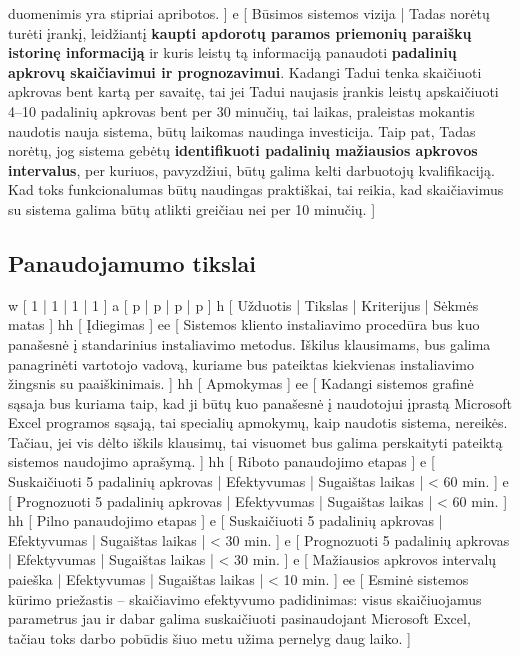 {    duomenimis yra stipriai apribotos.
  ]
  e [ Būsimos sistemos vizija
  | 
    Tadas norėtų turėti įrankį, leidžiantį \textbf{kaupti apdorotų paramos priemonių paraiškų
    istorinę informaciją} ir kuris leistų tą informaciją panaudoti \textbf{padalinių apkrovų 
    skaičiavimui ir prognozavimui}.
    Kadangi Tadui tenka skaičiuoti apkrovas bent kartą per savaitę, tai jei Tadui naujasis 
    įrankis leistų apskaičiuoti 4–10 padalinių apkrovas bent per 30 minučių, 
    tai laikas, praleistas mokantis naudotis nauja sistema, būtų laikomas naudinga investicija.
    Taip pat, Tadas norėtų, jog sistema gebėtų \textbf{identifikuoti padalinių
    mažiausios apkrovos intervalus}, per kuriuos, pavyzdžiui, būtų galima kelti darbuotojų
    kvalifikaciją. Kad toks funkcionalumas būtų naudingas praktiškai, tai 
    reikia, kad skaičiavimus su sistema galima būtų atlikti greičiau
    nei per 10 minučių.
  ]
}

\subsection{Panaudojamumo tikslai}
\xtable
{
  w [ 1 | 1 | 1 | 1 ]
  a [ p | p | p | p ]
  h [ Užduotis | Tikslas | Kriterijus | Sėkmės matas ]
  hh [ Įdiegimas ]
  ee 
  [ 
    Sistemos kliento instaliavimo procedūra bus kuo panašesnė į standarinius instaliavimo 
    metodus. Iškilus klausimams, bus galima panagrinėti vartotojo vadovą, kuriame bus pateiktas
    kiekvienas instaliavimo žingsnis su paaiškinimais.
  ]
  hh [ Apmokymas ]
  ee 
  [ 
    Kadangi sistemos grafinė sąsaja bus kuriama taip, kad ji būtų kuo
    panašesnė į naudotojui įprastą Microsoft Excel programos sąsają,
    tai specialių apmokymų, kaip naudotis sistema, nereikės. Tačiau,
    jei vis dėlto iškils klausimų, tai visuomet bus galima perskaityti
    pateiktą sistemos naudojimo aprašymą.
  ]
  hh [ Riboto panaudojimo etapas ]
  e [ Suskaičiuoti 5 padalinių apkrovas | Efektyvumas | Sugaištas laikas | < 60 min. ]
  e [ Prognozuoti 5 padalinių apkrovas | Efektyvumas | Sugaištas laikas | < 60 min. ]
  hh [ Pilno panaudojimo etapas ]
  e [ Suskaičiuoti 5 padalinių apkrovas | Efektyvumas | Sugaištas laikas | < 30 min. ]
  e [ Prognozuoti 5 padalinių apkrovas | Efektyvumas | Sugaištas laikas | < 30 min. ]
  e [ Mažiausios apkrovos intervalų paieška | Efektyvumas | Sugaištas laikas | < 10 min. ]
  ee 
  [ 
    Esminė sistemos kūrimo priežastis – skaičiavimo efektyvumo padidinimas: visus skaičiuojamus
    parametrus jau ir dabar galima suskaičiuoti pasinaudojant Microsoft Excel, tačiau toks
    darbo pobūdis šiuo metu užima pernelyg daug laiko.
  ]
}


